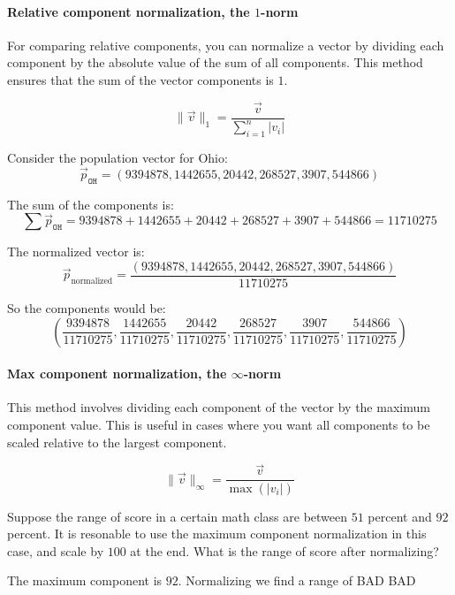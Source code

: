 \documentclass{ximera}
\begin{document}
\paragraph{Relative component normalization, the $1$-norm}

For comparing relative components, you can normalize a vector by
dividing each component by the absolute value of the sum of all
components. This method ensures that the sum of the vector components
is $1$.

\[ \|\vec{v}\|_1 = \frac{\vec{v}}{\sum_{i=1}^n |v_i|} \]

\begin{example}
Consider the population vector for Ohio:
\[ \vec{p}_{\texttt{OH}} = (9394878, 1442655, 20442, 268527, 3907, 544866) \]

The sum of the components is:
\[ \sum \vec{p}_{\texttt{OH}} = 9394878 + 1442655 + 20442 + 268527 + 3907 + 544866 = 11710275 \]

The normalized vector is:
\[ \vec{p}_{\text{normalized}} = \frac{(9394878, 1442655, 20442, 268527, 3907, 544866)}{11710275} \]

So the components would be:
\[ \left(\frac{9394878}{11710275}, \frac{1442655}{11710275}, \frac{20442}{11710275}, \frac{268527}{11710275}, \frac{3907}{11710275}, \frac{544866}{11710275}\right) \]
\end{example}






\paragraph{Max component normalization, the $\infty$-norm}

This method involves dividing each component of the vector by the maximum component value. This is useful in cases where you want all components to be scaled relative to the largest component.

\[ \|\vec{v}\|_\infty = \frac{\vec{v}}{\max(|v_i|)} \]

\begin{example}
Suppose the range of score in a certain math class are between $51$
percent and $92$ percent. It is resonable to use the maximum component
normalization in this case, and scale by $100$ at the end. What is the
range of score after normalizing?
\begin{explanation}
The maximum component is $92$. Normalizing we find a range of  BAD BAD
\end{explanation}
\end{example}
\end{document}
